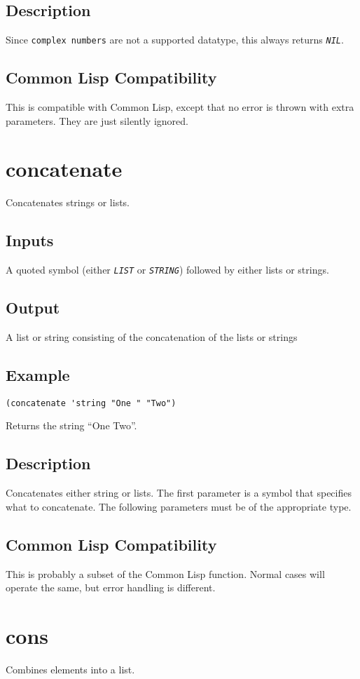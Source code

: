 \documentclass[10pt, openany]{book}
\newcommand{\constant}[1]{\emph{\texttt{#1}}}
\newcommand{\datatype}[1]{\texttt{#1}}
\newcommand{\cl}{Common Lisp}
\begin{document}
\subsection{Description}
Since \datatype{complex numbers} are not a supported datatype, this always returns \constant{NIL}.
\subsection{Common Lisp Compatibility}
This is compatible with \cl, except that no error is thrown with extra parameters.  They are just silently ignored.

\section{concatenate}
Concatenates strings or lists.
\subsection{Inputs}
A quoted symbol (either \constant{LIST} or \constant{STRING}) followed by either lists or strings.
\subsection{Output}
A list or string consisting of the concatenation of the lists or strings
\subsection{Example}
\begin{lstlisting}
(concatenate 'string "One " "Two")
\end{lstlisting}
Returns the string ``One Two''.
\subsection{Description}
Concatenates either string or lists.  The first parameter is a symbol that specifies what to concatenate.  The following parameters must be of the appropriate type.
\subsection{Common Lisp Compatibility}
This is probably a subset of the \cl{} function.  Normal cases will operate the same, but error handling is different.

\section{cons}
Combines elements into a list.
\end{document}
